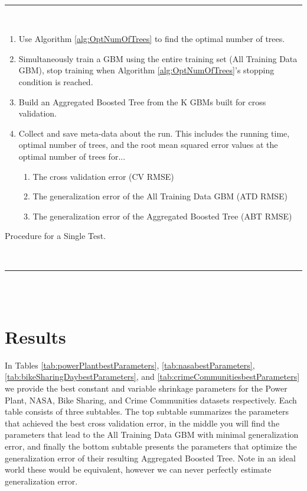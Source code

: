 \documentclass[9pt, conference]{IEEEtran}
\begin{document}
\begin{algorithm}[]
	\hspace{1 mm} \\\hrule\hspace{1 mm} \\
	\begin{enumerate}
		\item Use Algorithm \ref{alg:OptNumOfTrees} to find the optimal number of trees. 
		\item Simultaneously train a GBM using the entire training set (All Training Data GBM), stop training when Algorithm \ref{alg:OptNumOfTrees}'s stopping condition is reached.
		\item Build an Aggregated Boosted Tree from the K GBMs built for cross validation.
		\item Collect and save meta-data about the run. This includes the running time, optimal number of trees, and the root mean squared error values at the optimal number of trees for...
		\begin{enumerate}
			\item The cross validation error (CV RMSE)
			\item The generalization error of the All Training Data GBM (ATD RMSE)
			\item The generalization error of the Aggregated Boosted Tree (ABT RMSE)
		\end{enumerate}
	\end{enumerate}
	\caption{Procedure for a Single Test.}
	\hspace{1 mm} \\\hrule\hspace{1 mm} \\\hspace{1 mm} \\
	\label{alg:tuningProcedure}
\end{algorithm}%

\begin{figure}[!t]

\end{figure}
\section{Results}
\label{sec:results}

In Tables \ref{tab:powerPlantbestParameters}, \ref{tab:nasabestParameters}, \ref{tab:bikeSharingDaybestParameters}, and \ref{tab:crimeCommunitiesbestParameters} we provide the best constant and variable shrinkage parameters for the Power Plant, NASA, Bike Sharing, and Crime Communities datasets respectively. Each table consists of three subtables. The top subtable summarizes the parameters that achieved the best cross validation error, in the middle you will find the parameters that lead to the All Training Data GBM with minimal generalization error, and finally the bottom subtable presents the parameters that optimize the generalization error of their resulting Aggregated Boosted Tree. Note in an ideal world these would be equivalent, however we can never perfectly estimate generalization error.
\end{document}
